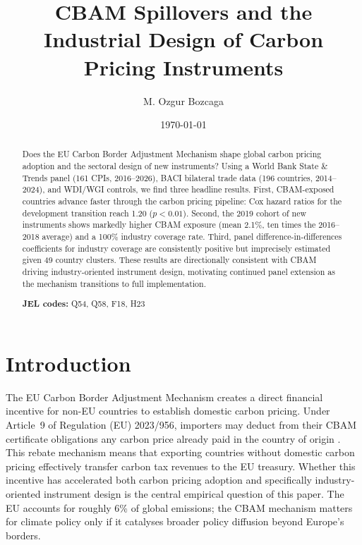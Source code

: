 \documentclass[12pt,a4paper]{article}
\begin{document}
\title{CBAM Spillovers and the Industrial Design of Carbon Pricing Instruments}
\author{M. Ozgur Bozcaga}
\date{\today}
\maketitle

\begin{abstract}
\noindent
Does the EU Carbon Border Adjustment Mechanism shape global carbon pricing adoption and the sectoral design of new instruments? Using a World Bank State \& Trends panel (161 CPIs, 2016--2026), BACI bilateral trade data (196 countries, 2014--2024), and WDI/WGI controls, we find three headline results. First, CBAM-exposed countries advance faster through the carbon pricing pipeline: Cox hazard ratios for the development transition reach 1.20 ($p<0.01$). Second, the 2019 cohort of new instruments shows markedly higher CBAM exposure (mean 2.1\%, ten times the 2016--2018 average) and a 100\% industry coverage rate. Third, panel difference-in-differences coefficients for industry coverage are consistently positive but imprecisely estimated given 49 country clusters. These results are directionally consistent with CBAM driving industry-oriented instrument design, motivating continued panel extension as the mechanism transitions to full implementation.

\medskip
\noindent \textbf{JEL codes:} Q54, Q58, F18, H23
\end{abstract}

\newpage

\section{Introduction}\label{sec:intro}

The EU Carbon Border Adjustment Mechanism creates a direct financial incentive for non-EU countries to establish domestic carbon pricing. Under Article~9 of Regulation (EU) 2023/956, importers may deduct from their CBAM certificate obligations any carbon price already paid in the country of origin \citep{CBAM2023}. This rebate mechanism means that exporting countries without domestic carbon pricing effectively transfer carbon tax revenues to the EU treasury. Whether this incentive has accelerated both carbon pricing adoption and specifically industry-oriented instrument design is the central empirical question of this paper. The EU accounts for roughly 6\% of global emissions; the CBAM mechanism matters for climate policy only if it catalyses broader policy diffusion beyond Europe's borders.
\end{document}
